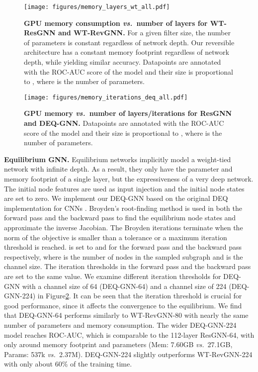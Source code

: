 \documentclass{article}
\newcommand{\vs}{\emph{vs.~}}
\newcommand{\figLabel}{Figure\xspace}
\newcommand{\mysection}[1]{\vspace{0pt}\noindent\textbf{#1.}}
\begin{document}
\begin{figure}[h]
    \centering
    \texttt{[image: figures/memory\_layers\_wt\_all.pdf]}
    \caption{\textbf{GPU memory consumption \vs number of layers for WT-ResGNN and WT-RevGNN.} For a given filter size, the number of parameters is constant regardless of network depth. Our reversible architecture has a constant memory footprint regardless of network depth, while yielding similar accuracy. Datapoints are annotated with the ROC-AUC score of the model and their size is proportional to , where  is the number of parameters.}
    \label{fig:memory_layers_wt}
    \vspace{4pt}
\end{figure}

\begin{figure}[h]
    \centering
    \texttt{[image: figures/memory\_iterations\_deq\_all.pdf]}
    \caption{\textbf{GPU memory \vs number of layers/iterations for ResGNN and DEQ-GNN.} Datapoints are annotated with the ROC-AUC score of the model and their size is proportional to , where  is the number of parameters.}
    \label{fig:memory_iterations_deq}
    \vspace{4pt}
\end{figure}

\mysection{Equilibrium GNN}
Equilibrium networks implicitly model a weight-tied network with infinite depth. As a result, they only have the parameter and memory footprint of a single layer, but the expressiveness of a very deep network. The initial node features  are used as input injection and the initial node states  are set to zero. We implement our DEQ-GNN based on the original DEQ implementation for CNNs \citep{bai2019deep}. Broyden’s root-finding method is used \citep{broyden1965class} in both the forward pass and the backward pass to find the equilibrium node states and approximate the inverse Jacobian. The Broyden iterations terminate when the norm of the objective is smaller than a tolerance  or a maximum iteration threshold is reached.  is set to  and  for the forward pass and the backward pass respectively, where  is the number of nodes in the sampled subgraph and  is the channel size. The iteration thresholds in the forward pass and the backward pass are set to the same value. We examine different iteration thresholds for DEQ-GNN with a channel size of 64 (DEQ-GNN-64) and a channel size of 224 (DEQ-GNN-224) in \figLabel \ref{fig:memory_iterations_deq}. It can be seen that the iteration threshold is crucial for good performance, since it affects the convergence to the equilibrium. We find that DEQ-GNN-64 performs similarly to WT-RevGNN-80 with nearly the same number of parameters and memory consumption.
The wider DEQ-GNN-224 model reaches  ROC-AUC, which is comparable to the 112-layer ResGNN-64, with only around  memory footprint and  parameters (Mem: 7.60GB \vs 27.1GB, Params: 537k \vs 2.37M). DEQ-GNN-224 slightly outperforms WT-RevGNN-224 with only about 60\% of the training time.
\end{document}
